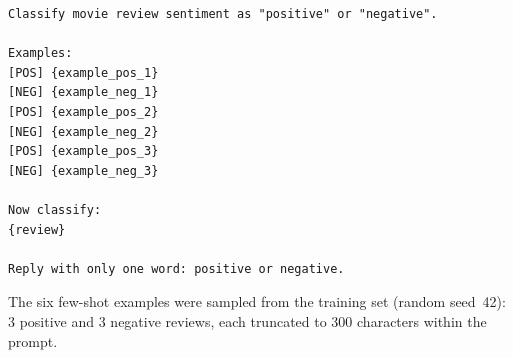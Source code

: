 \documentclass[12pt,reqno,twoside]{amsbook}
\theoremstyle{plain}
\numberwithin{equation}{chapter}
\numberwithin{section}{chapter}
\begin{document}
\begin{lstlisting}
Classify movie review sentiment as "positive" or "negative".

Examples:
[POS] {example_pos_1}
[NEG] {example_neg_1}
[POS] {example_pos_2}
[NEG] {example_neg_2}
[POS] {example_pos_3}
[NEG] {example_neg_3}

Now classify:
{review}

Reply with only one word: positive or negative.
\end{lstlisting}

\noindent The six few-shot examples were sampled from the training set (random
seed~42): 3 positive and 3 negative reviews, each truncated to 300 characters
within the prompt.
\end{document}
